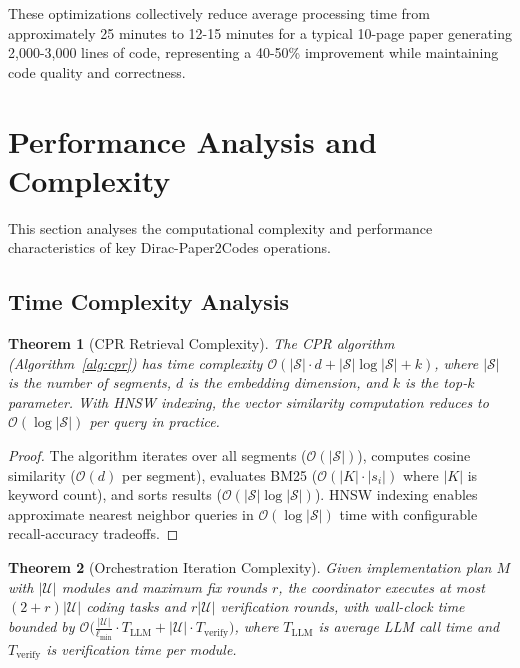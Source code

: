 \documentclass{ieeeaccess}
\newtheorem{theorem}{Theorem}
\begin{document}
These optimizations collectively reduce average processing time from approximately 25 minutes to 12-15 minutes for a typical 10-page paper generating 2,000-3,000 lines of code, representing a 40-50\% improvement while maintaining code quality and correctness.

\section{Performance Analysis and Complexity}
This section analyses the computational complexity and performance characteristics of key Dirac-Paper2Codes operations.

\subsection{Time Complexity Analysis}
\begin{theorem}[CPR Retrieval Complexity]
The CPR algorithm (Algorithm~\ref{alg:cpr}) has time complexity \(\mathcal{O}(|\mathcal{S}| \cdot d + |\mathcal{S}| \log |\mathcal{S}| + k)\), where \(|\mathcal{S}|\) is the number of segments, \(d\) is the embedding dimension, and \(k\) is the top-\(k\) parameter. With HNSW indexing, the vector similarity computation reduces to \(\mathcal{O}(\log |\mathcal{S}|)\) per query in practice.
\end{theorem}

\begin{proof}
The algorithm iterates over all segments (\(\mathcal{O}(|\mathcal{S}|)\)), computes cosine similarity (\(\mathcal{O}(d)\) per segment), evaluates BM25 (\(\mathcal{O}(|K| \cdot |s_i|)\) where \(|K|\) is keyword count), and sorts results (\(\mathcal{O}(|\mathcal{S}| \log |\mathcal{S}|)\)). HNSW indexing enables approximate nearest neighbor queries in \(\mathcal{O}(\log |\mathcal{S}|)\) time with configurable recall-accuracy tradeoffs.
\end{proof}

\begin{theorem}[Orchestration Iteration Complexity]
Given implementation plan \(M\) with \(|\mathcal{U}|\) modules and maximum fix rounds \(r\), the coordinator executes at most \((2+r)|\mathcal{U}|\) coding tasks and \(r|\mathcal{U}|\) verification rounds, with wall-clock time bounded by \(\mathcal{O}\bigl(\frac{|\mathcal{U}|}{\ell_{\min}} \cdot T_{\text{LLM}} + |\mathcal{U}| \cdot T_{\text{verify}}\bigr)\), where \(T_{\text{LLM}}\) is average LLM call time and \(T_{\text{verify}}\) is verification time per module.
\end{theorem}
\end{document}
